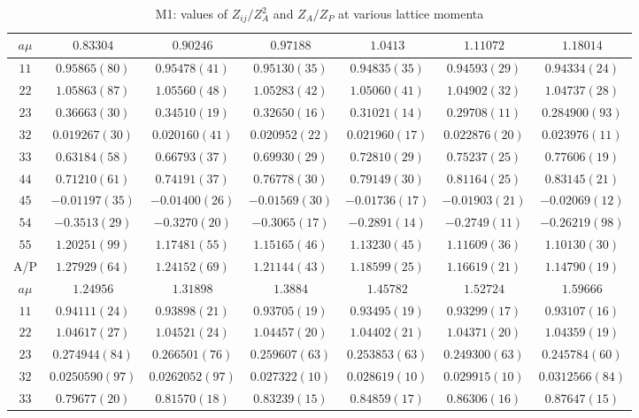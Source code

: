 \begin{table}
\begin{center}
\caption{M1: values of $Z_{ij}/Z_A^2$ and $Z_A/Z_P$ at various lattice momenta}
\begin{tabular}{c|c c c c c c}
\hline
\hline
$a\mu$ & $0.83304$ & $0.90246$ & $0.97188$ & $1.0413$ & $1.11072$ & $1.18014$ \\
\hline
$11$ & $0.95865(80)$ & $0.95478(41)$ & $0.95130(35)$ & $0.94835(35)$ & $0.94593(29)$ & $0.94334(24)$ \\
$22$ & $1.05863(87)$ & $1.05560(48)$ & $1.05283(42)$ & $1.05060(41)$ & $1.04902(32)$ & $1.04737(28)$ \\
$23$ & $0.36663(30)$ & $0.34510(19)$ & $0.32650(16)$ & $0.31021(14)$ & $0.29708(11)$ & $0.284900(93)$ \\
$32$ & $0.019267(30)$ & $0.020160(41)$ & $0.020952(22)$ & $0.021960(17)$ & $0.022876(20)$ & $0.023976(11)$ \\
$33$ & $0.63184(58)$ & $0.66793(37)$ & $0.69930(29)$ & $0.72810(29)$ & $0.75237(25)$ & $0.77606(19)$ \\
$44$ & $0.71210(61)$ & $0.74191(37)$ & $0.76778(30)$ & $0.79149(30)$ & $0.81164(25)$ & $0.83145(21)$ \\
$45$ & $-0.01197(35)$ & $-0.01400(26)$ & $-0.01569(30)$ & $-0.01736(17)$ & $-0.01903(21)$ & $-0.02069(12)$ \\
$54$ & $-0.3513(29)$ & $-0.3270(20)$ & $-0.3065(17)$ & $-0.2891(14)$ & $-0.2749(11)$ & $-0.26219(98)$ \\
$55$ & $1.20251(99)$ & $1.17481(55)$ & $1.15165(46)$ & $1.13230(45)$ & $1.11609(36)$ & $1.10130(30)$ \\
\hline
A/P & $1.27929(64)$ & $1.24152(69)$ & $1.21144(43)$ & $1.18599(25)$ & $1.16619(21)$ & $1.14790(19)$ \\
\hline
$a\mu$ & $1.24956$ & $1.31898$ & $1.3884$ & $1.45782$ & $1.52724$ & $1.59666$ \\
\hline
$11$ & $0.94111(24)$ & $0.93898(21)$ & $0.93705(19)$ & $0.93495(19)$ & $0.93299(17)$ & $0.93107(16)$ \\
$22$ & $1.04617(27)$ & $1.04521(24)$ & $1.04457(20)$ & $1.04402(21)$ & $1.04371(20)$ & $1.04359(19)$ \\
$23$ & $0.274944(84)$ & $0.266501(76)$ & $0.259607(63)$ & $0.253853(63)$ & $0.249300(63)$ & $0.245784(60)$ \\
$32$ & $0.0250590(97)$ & $0.0262052(97)$ & $0.027322(10)$ & $0.028619(10)$ & $0.029915(10)$ & $0.0312566(84)$ \\
$33$ & $0.79677(20)$ & $0.81570(18)$ & $0.83239(15)$ & $0.84859(17)$ & $0.86306(16)$ & $0.87647(15)$ \\

\end{tabular}
\end{center}
\end{table}
